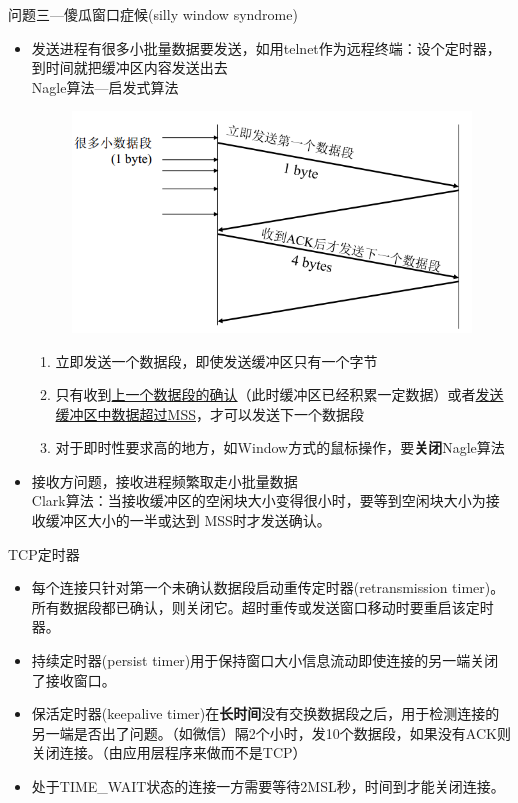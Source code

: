 问题三---傻瓜窗口症候(silly window syndrome)
\begin{itemize}
    \item 发送进程有很多小批量数据要发送，如用telnet作为远程终端：设个定时器，到时间就把缓冲区内容发送出去\\
    Nagle算法---启发式算法
    \begin{figure}[H]
        \centering
        \includegraphics[width=0.6\linewidth]{fig/nagle.PNG}
    \end{figure}
    \begin{enumerate}
        \item 立即发送一个数据段，即使发送缓冲区只有一个字节
        \item 只有收到\underline{上一个数据段的确认}（此时缓冲区已经积累一定数据）或者\underline{发送缓冲区中数据超过MSS}，才可以发送下一个数据段
        \item 对于即时性要求高的地方，如Window方式的鼠标操作，要\textbf{关闭}Nagle算法
    \end{enumerate}
    \item 接收方问题，接收进程频繁取走小批量数据\\
    Clark算法：当接收缓冲区的空闲块大小变得很小时，要等到空闲块大小为接收缓冲区大小的一半或达到 MSS时才发送确认。
\end{itemize}

TCP定时器
\begin{itemize}
\item 每个连接只针对第一个未确认数据段启动重传定时器(retransmission timer)。所有数据段都已确认，则关闭它。超时重传或发送窗口移动时要重启该定时器。
\item 持续定时器(persist timer)用于保持窗口大小信息流动即使连接的另一端关闭了接收窗口。
\item 保活定时器(keepalive timer)在\textbf{长时间}没有交换数据段之后，用于检测连接的另一端是否出了问题。（如微信）隔2个小时，发10个数据段，如果没有ACK则关闭连接。（由应用层程序来做而不是TCP）
\item 处于TIME\_WAIT状态的连接一方需要等待2MSL秒，时间到才能关闭连接。
\end{itemize}
